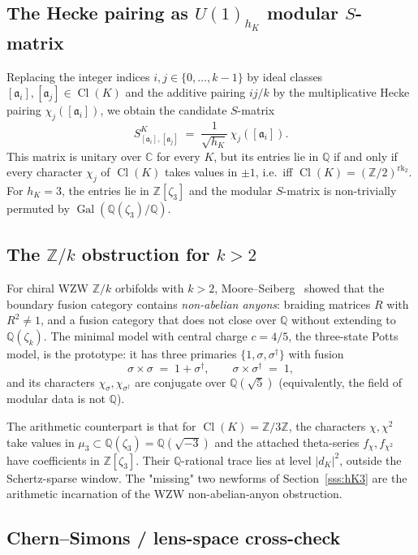 \documentclass[11pt,a4paper]{amsart}
\theoremstyle{definition}
\DeclareMathOperator{\Gal}{Gal}
\DeclareMathOperator{\Cl}{Cl}
\DeclareMathOperator{\rk}{rk}
\newcommand{\Q}{\mathbb{Q}}
\newcommand{\Z}{\mathbb{Z}}
\newcommand{\C}{\mathbb{C}}
\newcommand{\fa}{\mathfrak{a}}
\newcommand{\hK}{h_{K}}
\newcommand{\rktwo}{\rk_{2}}
\begin{document}
\subsection{The Hecke pairing as $U(1)_{h_K}$ modular $S$-matrix}\label{ss:Hecke-S-matrix}

Replacing the integer indices $i, j \in \{0, \ldots, k-1\}$ by ideal classes
$[\fa_i], [\fa_j] \in \Cl(K)$ and the additive pairing $ij/k$ by the multiplicative Hecke
pairing $\chi_j([\fa_i])$, we obtain the candidate $S$-matrix
\[
  S^K_{[\fa_i],[\fa_j]} \;=\; \frac{1}{\sqrt{\hK}}\, \chi_j([\fa_i]).
\]
This matrix is unitary over $\C$ for every $K$, but its entries lie in $\Q$ if and only
if every character $\chi_j$ of $\Cl(K)$ takes values in $\pm 1$, i.e.\ iff
$\Cl(K) = (\Z/2)^{\rktwo}$. For $\hK = 3$, the entries lie in $\Z[\zeta_3]$ and the
modular $S$-matrix is non-trivially permuted by $\Gal(\Q(\zeta_3)/\Q)$.

\subsection{The $\Z/k$ obstruction for $k > 2$}\label{ss:Zk-obstruction}

For chiral WZW $\Z/k$ orbifolds with $k > 2$, Moore--Seiberg~\cite{MooreSeiberg1989}
showed that the boundary fusion category contains \emph{non-abelian anyons}: braiding
matrices $R$ with $R^2 \ne 1$, and a fusion category that does not close over $\Q$
without extending to $\Q(\zeta_k)$. The minimal model with central charge $c = 4/5$, the
three-state Potts model, is the prototype: it has three primaries $\{1, \sigma, \sigma^\dagger\}$
with fusion
\[
  \sigma \times \sigma \;=\; 1 + \sigma^\dagger, \qquad \sigma \times \sigma^\dagger \;=\; 1,
\]
and its characters $\chi_\sigma, \chi_{\sigma^\dagger}$ are conjugate over $\Q(\sqrt 5)$
(equivalently, the field of modular data is not $\Q$).

The arithmetic counterpart is that for $\Cl(K) = \Z/3\Z$, the characters $\chi, \chi^2$
take values in $\mu_3 \subset \Q(\zeta_3) = \Q(\sqrt{-3})$ and the attached theta-series
$f_\chi, f_{\chi^2}$ have coefficients in $\Z[\zeta_3]$. Their $\Q$-rational trace lies at
level $|d_K|^2$, outside the Schertz-sparse window. The "missing" two newforms of
Section~\ref{sss:hK3} are the arithmetic incarnation of the WZW non-abelian-anyon
obstruction.

\subsection{Chern--Simons / lens-space cross-check}\label{ss:CS-lens}
\end{document}
